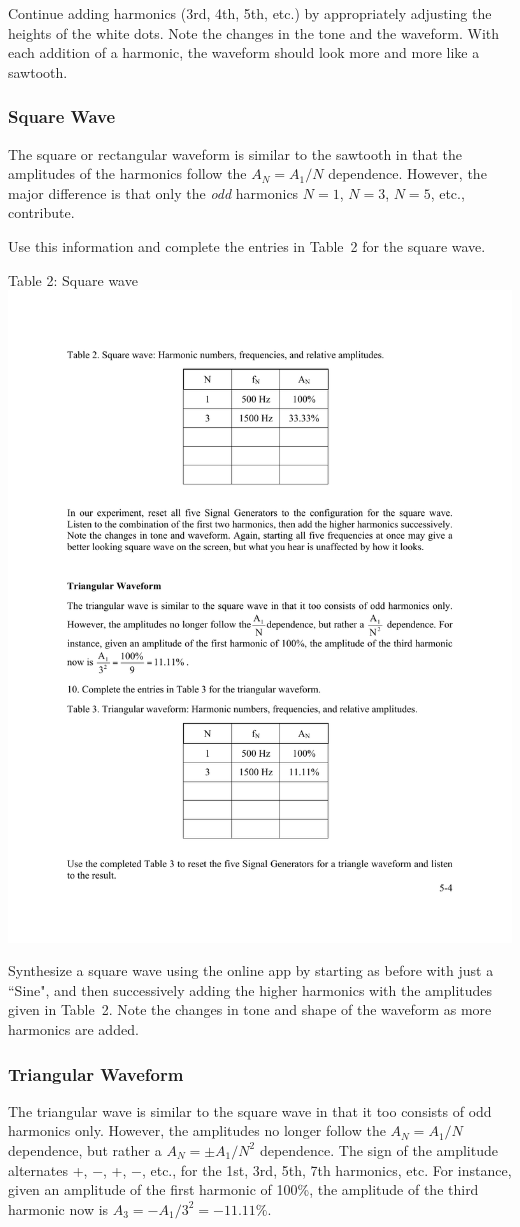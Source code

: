 \documentclass[11pt]{NSF}
\begin{document}
Continue adding harmonics (3rd, 4th, 5th, etc.) by appropriately
adjusting the heights of the white dots.
Note the changes in the tone and the waveform.
With each addition of a harmonic, the waveform should look more and 
more like a sawtooth.

\subsubsection{Square Wave}

The square or rectangular waveform is similar to the sawtooth 
in that the amplitudes of the harmonics follow the 
$A_N=A_1/N$ dependence. 
However, the major difference is that only the {\em odd}
harmonics $N=1$, $N=3$, $N=5$, etc., contribute.

Use this information and complete the entries in Table~2
for the square wave.
%
\begin{table}[hbtp]
\begin{center}
Table 2: Square wave\\
\includegraphics[width=.35\textwidth]{tab5_2}
\label{t:2}
\end{center}
\end{table}

Synthesize a square wave using the online app by starting as
before with just a ``Sine", and then successively adding the
higher harmonics with the amplitudes given in Table~2.
Note the changes in tone and shape of the waveform as more
harmonics are added.

\subsubsection{Triangular Waveform}

The triangular wave is similar to the square wave in that 
it too consists of odd harmonics only. However, 
the amplitudes no longer follow the $A_N=A_1/N$ dependence, 
but rather a $A_N = \pm A_1/N^2$ dependence. 
The sign of the amplitude alternates +, $-$, +, $-$, etc.,
for the 1st, 3rd, 5th, 7th harmonics, etc.
For instance, given an amplitude of the first harmonic of 100\%, 
the amplitude of the third harmonic now is
$A_3 = -A_1/3^2 = -11.11\%$.
\end{document}
